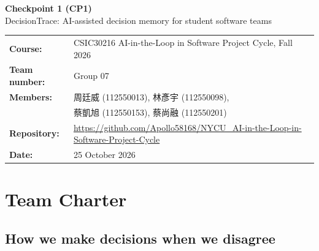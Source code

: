 \documentclass[11pt,a4paper]{article}
\begin{document}
\begin{center}
  {\LARGE\bfseries Checkpoint 1 (CP1)}\\[2pt]
  {\large DecisionTrace: AI-assisted decision memory for student software teams}
\end{center}

\begin{tabular}{@{}ll}
  \textbf{Course:} & CSIC30216 AI-in-the-Loop in Software Project Cycle, Fall 2026 \\
  \textbf{Team number:} & Group 07 \\
  \textbf{Members:} & 周廷威 (112550013), 林彥宇 (112550098), \\
  & 蔡凱旭 (112550153), 蔡尚融 (112550201) \\
  \textbf{Repository:} & \url{https://github.com/Apollo58168/NYCU_AI-in-the-Loop-in-Software-Project-Cycle} \\
  \textbf{Date:} & 25 October 2026 \\
\end{tabular}

\section{Team Charter}

\subsection{How we make decisions when we disagree}\label{sec:disagree}
\end{document}
